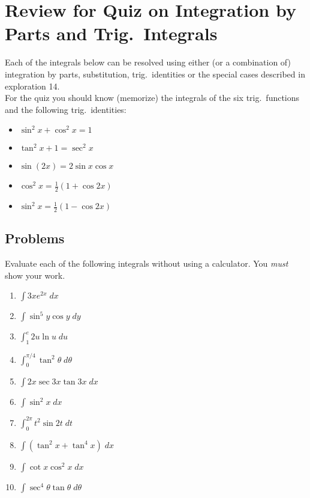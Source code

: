\documentclass[12pt,letterpaper,fleqn]{article}
\theoremstyle{definition}
\newcommand{\dint}{\ensuremath{\displaystyle\int}}
\begin{document}
\section*{Review for Quiz on Integration by Parts and Trig.\ Integrals}
Each of the integrals below can be resolved using either (or a combination of) integration by parts, substitution, trig.\ identities or the special cases described in exploration 14.\\[1.5ex] For the quiz you should know (memorize) the integrals of the six trig.\ functions and the following trig.\ identities:
\begin{itemize}
  \item $\sin^2 x + \cos^2 x = 1$
  \item $\tan^2 x + 1 = \sec^2 x$
  \item $\sin(2x) = 2\sin x \cos x$
  \item $\cos^2 x = \frac{1}{2}\left(1 + \cos 2x\right)$
  \item $\sin^2 x = \frac{1}{2}\left(1 - \cos 2x\right)$
\end{itemize}
\subsection*{Problems}
Evaluate each of the following integrals without using a calculator. You \emph{must} show your work.
\begin{enumerate}
  \item $\dint 3x e^{2x}\;dx$
  \item $\dint \sin^5 y\cos y\;dy$
  \item $\dint_1^e 2u \ln u\;du$
  \item $\dint_0^{\pi/4}\tan^2 \theta\;d\theta$
  \item $\dint 2x\sec 3x\tan 3x\;dx$
  \item $\dint \sin^2 x\;dx$
  \item $\dint_0^{2\pi} t^2\sin 2t\;dt$
  \item $\dint \left(\tan^2 x + \tan^4 x\right)\;dx$
  \item $\dint \cot x \cos^2 x\;dx$
  \item $\dint \sec^4\theta \tan\theta\;d\theta$
\end{enumerate}
\newpage
\end{document}
